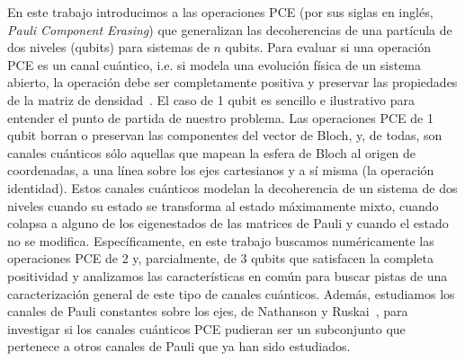 En este trabajo introducimos a las operaciones PCE (por sus siglas en inglés,
\textit{Pauli Component Erasing}) que generalizan las decoherencias de una
partícula de dos niveles (qubits) para sistemas de $n$ qubits.  Para evaluar si
una operación PCE es un canal cuántico, i.e. si modela una evolución física de
un sistema abierto, la operación debe ser completamente positiva y preservar
las propiedades de la matriz de densidad~\citep{bengtsson_zyczkowski_2017}.  El
caso de 1 qubit es sencillo e ilustrativo para entender el punto de partida de
nuestro problema.  Las operaciones PCE de 1 qubit borran o preservan las
componentes del vector de Bloch, y, de todas, son canales cuánticos sólo
aquellas que mapean la esfera de Bloch al origen de coordenadas, a una línea
sobre los ejes cartesianos y a sí misma (la operación identidad). Estos canales
cuánticos modelan la decoherencia de un sistema de dos niveles cuando su estado
se transforma al estado máximamente mixto, cuando colapsa a alguno de los
eigenestados de las matrices de Pauli y cuando el estado no se modifica.
Específicamente, en este trabajo buscamos numéricamente las operaciones PCE de
2 y, parcialmente, de 3 qubits que satisfacen la completa positividad y
analizamos las características en común para buscar pistas de una
caracterización general de este tipo de canales cuánticos. Además, estudiamos
los canales de Pauli constantes sobre los ejes, de Nathanson y
Ruskai~\cite{nathanson2007pauli}, para investigar si los canales cuánticos PCE
pudieran ser un subconjunto que pertenece a otros canales de Pauli que ya han
sido estudiados. 



